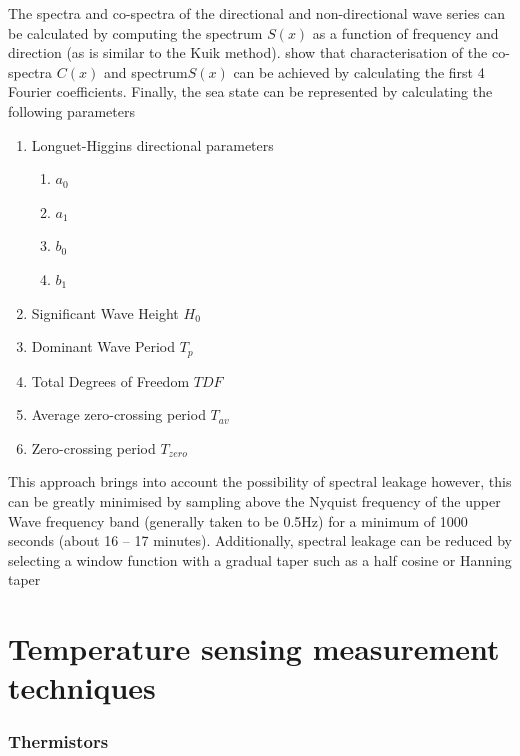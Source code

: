 The spectra and co-spectra of the directional and non-directional wave series can be calculated by computing the spectrum $S(x)$ as a function of frequency and direction (as is similar to the Kuik method). \textcite{earle1996nondirectional} show that characterisation of the co-spectra $C(x)$ and spectrum$S(x)$ can be achieved by calculating the first 4 Fourier coefficients. Finally, the sea state can be represented by calculating the following parameters

\begin{enumerate}
	\item Longuet-Higgins directional parameters
	\begin{enumerate}
		\item $a_0$
		\item $a_1$
		\item $b_0$
		\item $b_1$
	\end{enumerate}
	\item Significant Wave Height $H_0$
	\item Dominant Wave Period $T_p$
	\item Total Degrees of Freedom $TDF$
	\item Average zero-crossing period $T_{av}$
	\item Zero-crossing period $T_{zero}$
\end{enumerate}

This approach brings into account the possibility of spectral leakage however, this can be greatly minimised by sampling above the Nyquist frequency of the upper Wave frequency band (generally taken to be 0.5Hz) for a minimum of 1000 seconds (about 16 – 17 minutes). Additionally, spectral leakage can be reduced by selecting a window function with a gradual taper such as a half cosine or Hanning taper \cite{welch1967use}\par

\section{Temperature sensing measurement techniques}
\label{appendix:tempsense}
\subsubsection{Thermistors}


